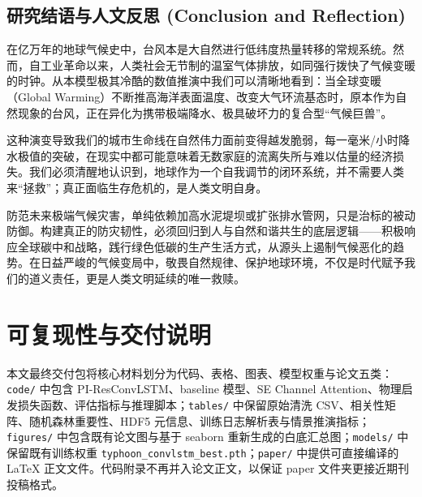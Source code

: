 \documentclass[12pt,a4paper]{ctexart}
\begin{document}
\subsection*{研究结语与人文反思 (Conclusion and Reflection)}
在亿万年的地球气候史中，台风本是大自然进行低纬度热量转移的常规系统。然而，自工业革命以来，人类社会无节制的温室气体排放，如同强行拨快了气候变暖的时钟。从本模型极其冷酷的数值推演中我们可以清晰地看到：当全球变暖（Global Warming）不断推高海洋表面温度、改变大气环流基态时，原本作为自然现象的台风，正在异化为携带极端降水、极具破坏力的复合型“气候巨兽”。

这种演变导致我们的城市生命线在自然伟力面前变得越发脆弱，每一毫米/小时降水极值的突破，在现实中都可能意味着无数家庭的流离失所与难以估量的经济损失。我们必须清醒地认识到，地球作为一个自我调节的闭环系统，并不需要人类来“拯救”；真正面临生存危机的，是人类文明自身。

防范未来极端气候灾害，单纯依赖加高水泥堤坝或扩张排水管网，只是治标的被动防御。构建真正的防灾韧性，必须回归到人与自然和谐共生的底层逻辑——积极响应全球碳中和战略，践行绿色低碳的生产生活方式，从源头上遏制气候恶化的趋势。在日益严峻的气候变局中，敬畏自然规律、保护地球环境，不仅是时代赋予我们的道义责任，更是人类文明延续的唯一救赎。


\section*{可复现性与交付说明}
本文最终交付包将核心材料划分为代码、表格、图表、模型权重与论文五类：\texttt{code/} 中包含 PI-ResConvLSTM、baseline 模型、SE Channel Attention、物理启发损失函数、评估指标与推理脚本；\texttt{tables/} 中保留原始清洗 CSV、相关性矩阵、随机森林重要性、HDF5 元信息、训练日志解析表与情景推演指标；\texttt{figures/} 中包含既有论文图与基于 seaborn 重新生成的白底汇总图；\texttt{models/} 中保留既有训练权重 \texttt{typhoon\_convlstm\_best.pth}；\texttt{paper/} 中提供可直接编译的 \LaTeX{} 正文文件。代码附录不再并入论文正文，以保证 paper 文件夹更接近期刊投稿格式。
\end{document}
